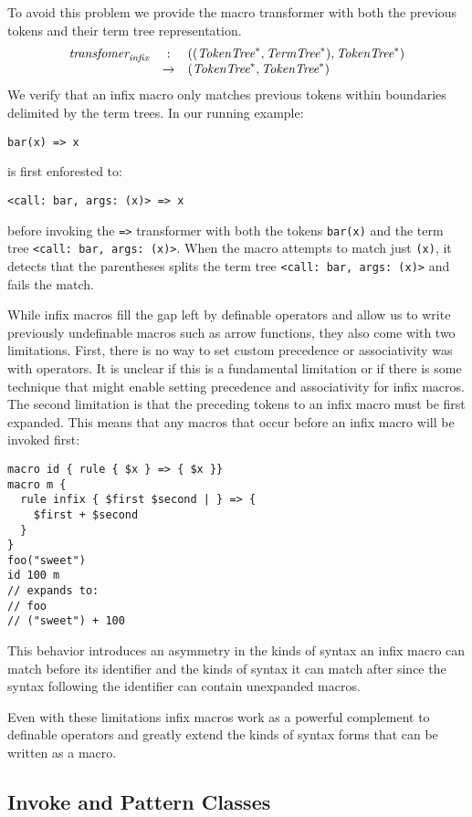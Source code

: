 \documentclass[preprint,10pt]{sigplanconf}
\begin{document}
To avoid this problem we provide the macro transformer with both the
previous tokens and their term tree representation.
\[
\begin{array}{rcl}
  \textit{transfomer}_{\textit{infix}} &:& ((\textit{TokenTree}^*, \textit{TermTree}^{*}), \textit{TokenTree}^*) 
  \\
  &\rightarrow& (\textit{TokenTree}^*, \textit{TokenTree}^*)
\end{array}
\]
We verify that an infix macro only
matches previous tokens within boundaries delimited by 
the term trees. In our running example:
\begin{lstlisting}
bar(x) => x
\end{lstlisting}
is first enforested to:
\begin{lstlisting}
<call: bar, args: (x)> => x
\end{lstlisting}
before invoking the \lstinline!=>! transformer with both the tokens
\lstinline!bar(x)! and the term tree
\lstinline!<call: bar, args: (x)>!. When the macro attempts to match
just \lstinline!(x)!, it detects that the parentheses splits the term
tree \lstinline!<call: bar, args: (x)>! and fails the match.

While infix macros fill the gap left by definable operators and allow
us to write previously undefinable macros such as arrow functions,
they also come with two limitations. First, there is no way to set
custom precedence or associativity was with operators. It is unclear
if this is a fundamental limitation or if there is some technique that
might enable setting precedence and associativity for infix macros.
The second limitation is that the preceding tokens to an infix macro
must be first expanded. This means that any macros that occur before
an infix macro will be invoked first:
\begin{lstlisting}
macro id { rule { $x } => { $x }}
macro m {
  rule infix { $first $second | } => {
    $first + $second   
  }
}
foo("sweet")
id 100 m
// expands to:
// foo
// ("sweet") + 100
\end{lstlisting}
This behavior introduces an asymmetry in the kinds of syntax an infix
macro can match before its identifier and the kinds of syntax it can
match after since the syntax following the identifier can contain
unexpanded macros.

Even with these limitations infix macros work as a powerful complement
to definable operators and greatly extend the kinds of syntax forms
that can be written as a macro.

\subsection{Invoke and Pattern Classes}
\label{sec:invoke}
\end{document}
